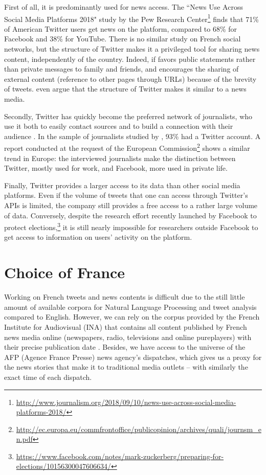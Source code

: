 	
	First of all, it is predominantly used for news access. The ``News Use Across Social Media Platforms 2018" study by the Pew Research Center\footnote{\url{http://www.journalism.org/2018/09/10/news-use-across-social-media-platforms-2018/}} finds that 71\% of American Twitter users get news on the platform, compared to 68\% for Facebook and 38\% for YouTube. There is no similar study on French social networks, but the structure of Twitter makes it a privileged tool for sharing news content, independently of the country. Indeed, if favors public statements rather than private messages to family and friends, and encourages the sharing of external content (reference to other pages through URLs) because of the brevity of tweets. \citet{kwak_twitter_2010} even argue that the structure of Twitter makes it similar to a news media.
	
	
	Secondly, Twitter has quickly become the preferred network of journalists, who use it both to easily contact sources and to build a connection with their audience \citep{swasy_little_2016}. In the sample of journalists studied by \citet{mcgregor_twitter_2018}, 93\% had a Twitter account. A report conducted at the request of the European Commission\footnote{\url{http://ec.europa.eu/commfrontoffice/publicopinion/archives/quali/journsm_en.pdf}} shows a similar trend in Europe: the interviewed journalists make the distinction between Twitter, mostly used for work, and Facebook, more used in private life.
	
	
	Finally, Twitter provides a larger access to its data than other social media platforms. Even if the volume of tweets that one can access through Twitter's APIs is limited, the company still provides a free access to a rather large volume of data. Conversely, despite the research effort recently launched by Facebook to protect elections,\footnote{\url{https://www.facebook.com/notes/mark-zuckerberg/preparing-for-elections/10156300047606634/}} it is still nearly
impossible for researchers outside Facebook to get access to information on users' activity on the platform.

\section{Choice of France}
Working on French tweets and news contents is difficult due to the still little amount of available corpora for Natural Language Processing and tweet analysis compared to English. However, we can rely on the corpus provided by the French Institute for Audiovisual (INA) that contains all content published by French news media online (newspapers, radio, televisions and online pureplayers) with their precise publication date \citep{cage2020production}. 
Besides, we have access to the universe of the AFP (Agence France Presse) news agency’s dispatches,
which gives us a proxy for the news stories that make it to traditional media outlets – with similarly the exact time of each dispatch. 



